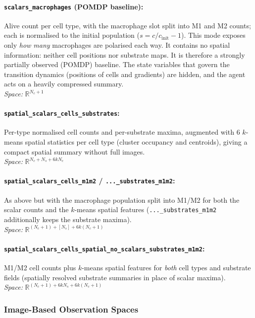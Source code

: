 \documentclass{article}
\begin{document}
\paragraph{\texttt{scalars\_macrophages} (POMDP baseline):}
Alive count per cell type, with the macrophage slot split into M1 and M2 counts;
each is normalised to the initial population ($s = c/c_{\text{init}} - 1$).
This mode exposes only \emph{how many} macrophages are polarised each way. It
contains no spatial information: neither cell positions nor substrate maps.
It is therefore a strongly partially observed (POMDP) baseline. The state
variables that govern the transition dynamics (positions of cells and gradients)
are hidden, and the agent acts on a heavily compressed summary.
\\ \textit{Space:} $\mathbb{R}^{N_c + 1}$

\paragraph{\texttt{spatial\_scalars\_cells\_substrates}:}
Per-type normalised cell counts and per-substrate maxima, augmented with $6$
$k$-means spatial statistics per cell type (cluster occupancy and centroids),
giving a compact spatial summary without full images.
\\ \textit{Space:} $\mathbb{R}^{N_c + N_s + 6kN_c}$

\paragraph{\texttt{spatial\_scalars\_cells\_m1m2} / \texttt{...\_substrates\_m1m2}:}
As above but with the macrophage population split into M1/M2 for both the
scalar counts and the $k$-means spatial features
(\texttt{...\_substrates\_m1m2} additionally keeps the substrate maxima).
\\ \textit{Space:} $\mathbb{R}^{(N_c+1) + [N_s] + 6k(N_c+1)}$

\paragraph{\texttt{spatial\_scalars\_cells\_spatial\_no\_scalars\_substrates\_m1m2}:}
M1/M2 cell counts plus $k$-means spatial features for \emph{both} cell types
and substrate fields (spatially resolved substrate summaries in place of scalar
maxima).
\\ \textit{Space:} $\mathbb{R}^{(N_c+1) + 6kN_s + 6k(N_c+1)}$

\subsubsection*{Image-Based Observation Spaces}
\end{document}
